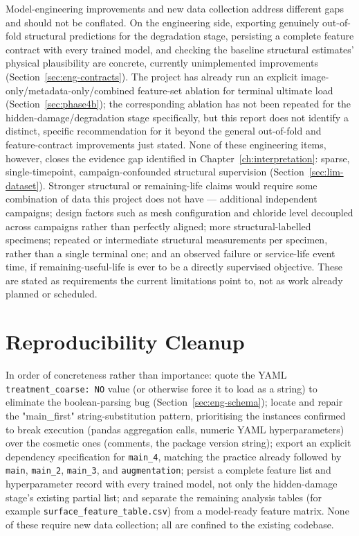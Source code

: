 Model-engineering improvements and new data collection address different
gaps and should not be conflated. On the engineering side, exporting
genuinely out-of-fold structural predictions for the degradation stage,
persisting a complete feature contract with every trained model, and
checking the baseline structural estimates' physical plausibility are
concrete, currently unimplemented improvements
(Section~\ref{sec:eng-contracts}). The project has already run an
explicit image-only/metadata-only/combined feature-set ablation for
terminal ultimate load (Section~\ref{sec:phase4b}); the corresponding
ablation has not been repeated for the hidden-damage/degradation stage
specifically, but this report does not identify a distinct, specific
recommendation for it beyond the general out-of-fold and feature-contract
improvements just stated. None of these engineering items, however,
closes the evidence gap identified in Chapter~\ref{ch:interpretation}:
sparse, single-timepoint, campaign-confounded structural supervision
(Section~\ref{sec:lim-dataset}). Stronger structural or remaining-life
claims would require some combination of data this project does not have
— additional independent campaigns; design factors such as mesh
configuration and chloride level decoupled across campaigns rather than
perfectly aligned; more structural-labelled specimens; repeated or
intermediate structural measurements per specimen, rather than a single
terminal one; and an observed failure or service-life event time, if
remaining-useful-life is ever to be a directly supervised objective. These
are stated as requirements the current limitations point to, not as work
already planned or scheduled.

\section{Reproducibility Cleanup}
\label{sec:status-cleanup}

In order of concreteness rather than importance: quote the YAML
\texttt{treatment\_coarse: NO} value (or otherwise force it to load as a
string) to eliminate the boolean-parsing bug
(Section~\ref{sec:eng-schema}); locate and repair the "main\_first"
string-substitution pattern, prioritising the instances confirmed to break
execution (pandas aggregation calls, numeric YAML hyperparameters) over
the cosmetic ones (comments, the package version string); export an
explicit dependency specification for \texttt{main\_4}, matching the
practice already followed by \texttt{main}, \texttt{main\_2},
\texttt{main\_3}, and \texttt{augmentation}; persist a complete feature
list and hyperparameter record with every trained model, not only the
hidden-damage stage's existing partial list; and separate the remaining
analysis tables (for example \texttt{surface\_feature\_table.csv}) from a
model-ready feature matrix. None of these require new data collection;
all are confined to the existing codebase.

